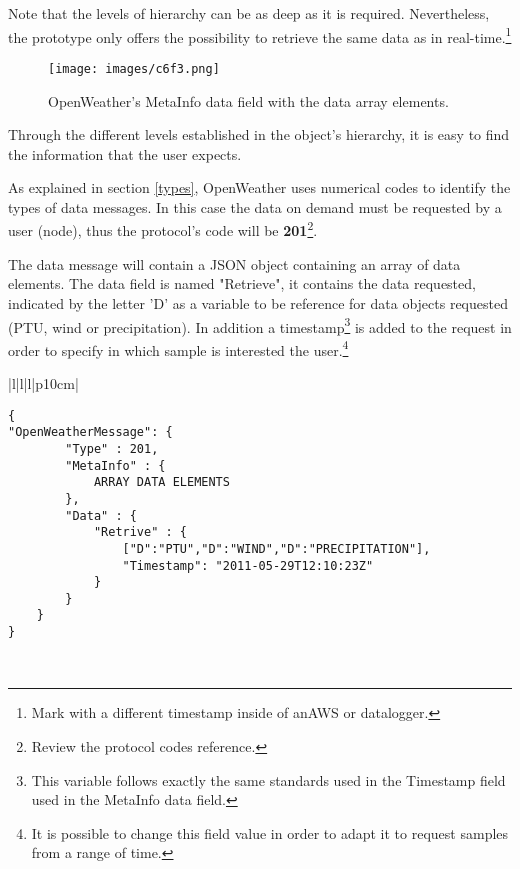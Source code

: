 Note that the levels of hierarchy can be as deep as it is required. Nevertheless, the prototype only offers the possibility to retrieve the same data as in real-time.\footnote{Mark with a different timestamp inside of an\gls{AWS} or datalogger.}

\begin{figure}[H]
\centerline{\texttt{[image: images/c6f3.png]}}
\caption{OpenWeather's MetaInfo data field with the data array elements.}
\end{figure}

Through the different levels established in the object's hierarchy, it is easy to find the information that the user expects.

As explained in section \ref{types}, OpenWeather uses numerical codes to identify the types of data messages. In this case the data on demand must be requested by a user (node), thus the protocol's code will be \textbf{201}\footnote{Review the protocol codes reference.}.

The data message will contain a \gls{JSON} object containing an array of data elements. The data field is named "Retrieve", it contains the data requested, indicated by the letter 'D' as a variable to be reference for data objects requested (\gls{PTU}, wind or precipitation). In addition a timestamp\footnote{This variable follows exactly the same standards used in the Timestamp field used in the MetaInfo data field.} is added to the request in order to specify in which sample is interested the user.\footnote{It is possible to change this field value in order to adapt it to request samples from a range of time.}

\begin{table}[H]
\centering
\begin{tabular}{|l|l|l|p{10cm}|}
\hline
\begin{minipage}[t]{\linewidth}
	\begin{verbatim}
{
"OpenWeatherMessage": {
        "Type" : 201,
        "MetaInfo" : {
            ARRAY DATA ELEMENTS
        },
        "Data" : {
            "Retrive" : {
                ["D":"PTU","D":"WIND","D":"PRECIPITATION"],
                "Timestamp": "2011-05-29T12:10:23Z"
            }
        }
    }
}   
      \end{verbatim}
\end{minipage} \\
\hline
\end{tabular}
\caption{Real-time data message of OpenWeather protocol.}
\end{table}


